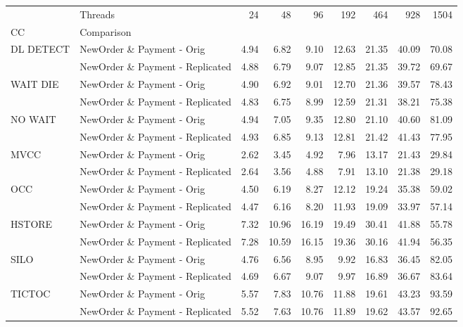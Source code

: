 \begin{tabular}{llrrrrrrr}
\toprule
       & Threads &  24   &  48   &  96   &  192  &  464  &  928  &  1504 \\
CC & Comparison &       &       &       &       &       &       &       \\
\midrule
DL DETECT & NewOrder \& Payment - Orig &  4.94 &  6.82 &  9.10 & 12.63 & 21.35 & 40.09 & 70.08 \\
       & NewOrder \& Payment - Replicated &  4.88 &  6.79 &  9.07 & 12.85 & 21.35 & 39.72 & 69.67 \\
WAIT DIE & NewOrder \& Payment - Orig &  4.90 &  6.92 &  9.01 & 12.70 & 21.36 & 39.57 & 78.43 \\
       & NewOrder \& Payment - Replicated &  4.83 &  6.75 &  8.99 & 12.59 & 21.31 & 38.21 & 75.38 \\
NO WAIT & NewOrder \& Payment - Orig &  4.94 &  7.05 &  9.35 & 12.80 & 21.10 & 40.60 & 81.09 \\
       & NewOrder \& Payment - Replicated &  4.93 &  6.85 &  9.13 & 12.81 & 21.42 & 41.43 & 77.95 \\
MVCC & NewOrder \& Payment - Orig &  2.62 &  3.45 &  4.92 &  7.96 & 13.17 & 21.43 & 29.84 \\
       & NewOrder \& Payment - Replicated &  2.64 &  3.56 &  4.88 &  7.91 & 13.10 & 21.38 & 29.18 \\
OCC & NewOrder \& Payment - Orig &  4.50 &  6.19 &  8.27 & 12.12 & 19.24 & 35.38 & 59.02 \\
       & NewOrder \& Payment - Replicated &  4.47 &  6.16 &  8.20 & 11.93 & 19.09 & 33.97 & 57.14 \\
HSTORE & NewOrder \& Payment - Orig &  7.32 & 10.96 & 16.19 & 19.49 & 30.41 & 41.88 & 55.78 \\
       & NewOrder \& Payment - Replicated &  7.28 & 10.59 & 16.15 & 19.36 & 30.16 & 41.94 & 56.35 \\
SILO & NewOrder \& Payment - Orig &  4.76 &  6.56 &  8.95 &  9.92 & 16.83 & 36.45 & 82.05 \\
       & NewOrder \& Payment - Replicated &  4.69 &  6.67 &  9.07 &  9.97 & 16.89 & 36.67 & 83.64 \\
TICTOC & NewOrder \& Payment - Orig &  5.57 &  7.83 & 10.76 & 11.88 & 19.61 & 43.23 & 93.59 \\
       & NewOrder \& Payment - Replicated &  5.52 &  7.63 & 10.76 & 11.89 & 19.62 & 43.57 & 92.65 \\
\bottomrule
\end{tabular}
